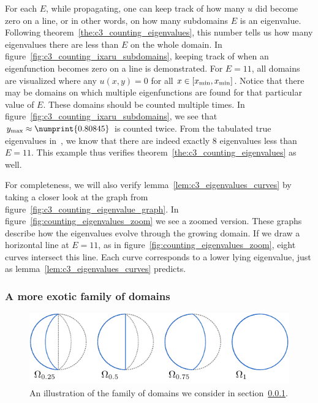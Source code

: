 For each $E$, while propagating, one can keep track of how many $u$ did become zero on a line, or in other words, on how many subdomains $E$ is an eigenvalue. Following theorem~\ref{the:c3_counting_eigenvalues}, this number tells us how many eigenvalues there are less than $E$ on the whole domain. In figure~\ref{fig:c3_counting_ixaru_subdomains}, keeping track of when an eigenfunction becomes zero on a line is demonstrated. For $E = 11$, all domains are visualized where any $u(x, y) = 0$ for all $x \in [{x_{\text{min}}}, {x_{\text{min}}}]$. Notice that there may be domains on which multiple eigenfunctions are found for that particular value of $E$. These domains should be counted multiple times. In figure~\ref{fig:c3_counting_ixaru_subdomains}, we see that $\ymax \approx \numprint{0.80845}$ is counted twice. From the tabulated true eigenvalues in~\cite{ixaru_new_2010}, we know that there are indeed exactly $8$ eigenvalues less than $E = 11$. This example thus verifies theorem~\ref{the:c3_counting_eigenvalues} as well.

For completeness, we will also verify lemma~\ref{lem:c3_eigenvalues_curves} by taking a closer look at the graph from figure~\ref{fig:c3_counting_eigenvalue_graph}. In figure~\ref{fig:counting_eigenvalues_zoom} we see a zoomed version. These graphs describe how the eigenvalues evolve through the growing domain. If we draw a horizontal line at $E = 11$, as in figure~\ref{fig:counting_eigenvalues_zoom}, eight curves intersect this line. Each curve corresponds to a lower lying eigenvalue, just as lemma~\ref{lem:c3_eigenvalues_curves} predicts.


\subsubsection{A more exotic family of domains}\label{sec:c3_counting_exotic_domain}

\begin{figure}
  \begin{center}
    \includegraphics[width=\linewidth]{img/chapter3/counting/moons.pdf}
    \caption{An illustration of the family of domains we consider in section~\ref{sec:c3_counting_exotic_domain}.}\label{fig:c3_counting_visual_moons}
  \end{center}
\end{figure}


